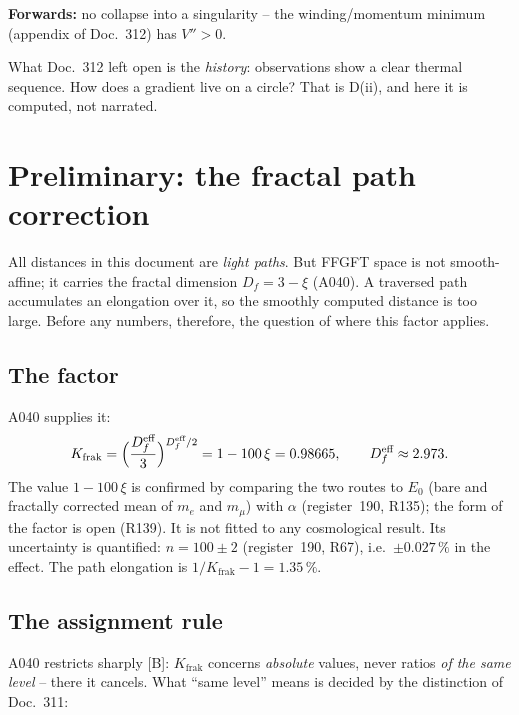 \textbf{Forwards:} no collapse into a singularity -- the
winding/momentum minimum (appendix of Doc.~312) has $V'' > 0$.

What Doc.~312 left open is the \emph{history}: observations show a
clear thermal sequence. How does a gradient live on a circle? That
is D(ii), and here it is computed, not narrated.

\chapter{Preliminary: the fractal path correction}

All distances in this document are \emph{light paths}. But FFGFT
space is not smooth-affine; it carries the fractal dimension
$D_f = 3-\xi$ (A040). A traversed path accumulates an elongation
over it, so the smoothly computed distance is too large. Before
any numbers, therefore, the question of where this factor applies.

\section{The factor}

A040 supplies it:
\begin{equation}
  K_\text{frak} = \Bigl(\frac{D_f^\text{eff}}{3}\Bigr)^{D_f^\text{eff}/2}
  = 1-100\,\xi = 0.98665,
  \qquad D_f^\text{eff} \approx 2.973 .
\end{equation}
The value $1-100\,\xi$ is confirmed by comparing the two routes to
$E_0$ (bare and fractally corrected mean of $m_e$ and $m_\mu$)
with $\alpha$ (register~190, R135); the form of the factor is open
(R139). It is not fitted to any cosmological result. Its
uncertainty is quantified:
$n = 100 \pm 2$ (register~190, R67), i.e.\ $\pm 0.027\,\%$ in
the effect. The path elongation is $1/K_\text{frak} - 1 = 1.35\,\%$.

\section{The assignment rule}

A040 restricts sharply [B]: $K_\text{frak}$ concerns
\emph{absolute} values, never ratios \emph{of the same level} --
there it cancels. What \enquote{same level} means is decided by
the distinction of Doc.~311:

